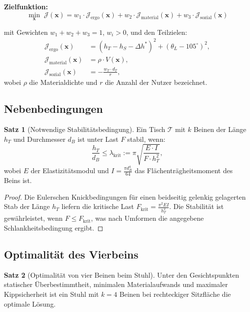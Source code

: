 \documentclass[a4paper,12pt]{article}
\theoremstyle{definition}
\newtheorem{satz}{Satz}
\begin{document}
\textbf{Zielfunktion:}
\[
	\min_{\mathbf{x}} \; \mathcal{J}(\mathbf{x})
	= w_1 \cdot \mathcal{J}_{\mathrm{ergo}}(\mathbf{x})
	+ w_2 \cdot \mathcal{J}_{\mathrm{material}}(\mathbf{x})
	+ w_3 \cdot \mathcal{J}_{\mathrm{sozial}}(\mathbf{x})
\]

mit Gewichten $w_1 + w_2 + w_3 = 1$, $w_i > 0$, und den Teilzielen:
\begin{align*}
	\mathcal{J}_{\mathrm{ergo}}(\mathbf{x})     &= \left(h_T - h_S - \Delta h^*\right)^2
	                                               + \left(\theta_L - 105^{\circ}\right)^2, \\
	\mathcal{J}_{\mathrm{material}}(\mathbf{x}) &= \rho \cdot V(\mathbf{x}), \\
	\mathcal{J}_{\mathrm{sozial}}(\mathbf{x})   &= -\frac{w_T \cdot d_T}{r},
\end{align*}
wobei $\rho$ die Materialdichte und $r$ die Anzahl der Nutzer bezeichnet.

\subsection{Nebenbedingungen}

\begin{satz}[Notwendige Stabilit\"{a}tsbedingung]
\label{satz:stabilitaet}
	Ein Tisch $\mathcal{T}$ mit $k$ Beinen der L\"{a}nge $h_T$ und Durchmesser $d_B$
	ist unter Last $F$ stabil, wenn:
	\[
		\frac{h_T}{d_B} \leq \lambda_{\mathrm{krit}} := \pi \sqrt{\frac{E \cdot I}{F \cdot h_T^2}},
	\]
	wobei $E$ der Elastizit\"{a}tsmodul und $I = \frac{\pi d_B^4}{64}$ das
	Fl\"{a}chentr\"{a}gheitsmoment des Beins ist.
\end{satz}

\begin{proof}
	Die Eulerschen Knickbedingungen f\"{u}r einen beidseitig gelenkig gelagerten Stab der
	L\"{a}nge $h_T$ liefern die kritische Last
	$F_{\mathrm{krit}} = \frac{\pi^2 E I}{h_T^2}$.
	Die Stabilit\"{a}t ist gew\"{a}hrleistet, wenn $F \leq F_{\mathrm{krit}}$, was nach Umformen
	die angegebene Schlankheitsbedingung ergibt.
\end{proof}

\subsection{Optimalit\"{a}t des Vierbeins}

\begin{satz}[Optimalit\"{a}t von vier Beinen beim Stuhl]
\label{satz:vierbeiner}
	Unter den Gesichtspunkten statischer \"{U}berbestimmtheit, minimalen Materialaufwands
	und maximaler Kippsicherheit ist ein Stuhl mit $k = 4$ Beinen bei rechteckiger
	Sitzfl\"{a}che die optimale L\"{o}sung.
\end{satz}
\end{document}
